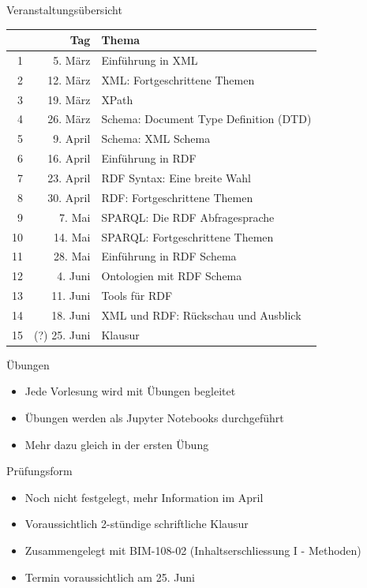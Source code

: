 \documentclass{beamer}
\begin{document}
\begin{frame}{Veranstaltungsübersicht}
	
	\scriptsize
	\begin{center}
	\begin{tabular}{rrp{7cm}}
	  & Tag  & Thema \\
	\hline
	1 & 5. März  & Einführung in XML \\
	2 & 12. März & XML: Fortgeschrittene Themen \\
	3 & 19. März & XPath \\
	4 & 26. März & Schema: Document Type Definition (DTD) \\
	5 & 9. April  & Schema: XML Schema \\
	6 & 16. April & Einführung in RDF \\
	7 & 23. April & RDF Syntax: Eine breite Wahl \\
	8 & 30. April & RDF: Fortgeschrittene Themen \\
	9 & 7. Mai  & SPARQL: Die RDF Abfragesprache \\
	10 & 14. Mai & SPARQL: Fortgeschrittene Themen \\
	11 & 28. Mai & Einführung in RDF Schema \\
	12 & 4. Juni & Ontologien mit RDF Schema \\
	13 & 11. Juni & Tools für RDF \\
	14 & 18. Juni & XML und RDF: Rückschau und Ausblick \\
	15 & (?) 25. Juni & Klausur \\
	\hline
	\end{tabular}
	\end{center}
	
\end{frame}

\begin{frame}{Übungen}
	
	\begin{itemize}
		\item Jede Vorlesung wird mit Übungen begleitet
		\item Übungen werden als Jupyter Notebooks durchgeführt
		\item Mehr dazu gleich in der ersten Übung
	\end{itemize}
	
\end{frame}

\begin{frame}{Prüfungsform}
	
	\begin{itemize}
		\item Noch nicht festgelegt, mehr Information im April
		\item Voraussichtlich 2-stündige schriftliche Klausur
		\item Zusammengelegt mit BIM-108-02 (Inhaltserschliessung I - Methoden)
		\item Termin voraussichtlich am 25. Juni
	\end{itemize}
	
\end{frame}
\end{document}
